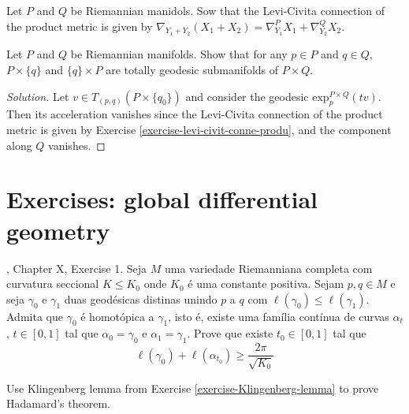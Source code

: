\begin{exercise}
\label{exercise-levi-civit-conne-produ}
Let $P$ and $Q$ be Riemannian manidols. Sow
that the Levi-Civita connection of
the product metric is given by
$\nabla_{Y_1+Y_2}(X_1+X_2)=\nabla^P_{Y_1}X_1+
\nabla^Q_{Y_2}X_2$.
\end{exercise}

\begin{exercise}
\label{exercise-total-geode-subma-produ}
Let $P$ and $Q$ be Riemannian manifolds. Show
that for any $p \in P$ and $q \in
Q$, $P\times \{q\}$ and $\{q\}\times P$ are
totally geodesic
submanifolds of $P \times Q$.
\end{exercise}

\begin{proof}[Solution]
Let $v \in T_{(p,q)}(P\times\{q_0\})$ and
consider the geodesic
 $\text{exp}_p^{P\times Q}(tv)$. Then
its acceleration vanishes since the
Levi-Civita connection of the product metric
is given by Exercise
\ref{exercise-levi-civit-conne-produ}, and
the
component along $Q$ vanishes.
\end{proof}

\section{Exercises: global differential
geometry}
\label{section-exerc-globa-diffe-geome}

\begin{exercise}
\label{exercise-Klingenberg-lemma}
\cite{doc}, Chapter X, Exercise 1. Seja $M$
uma variedade Riemanniana
completa com curvatura seccional $K \leq
K_0$ onde $K_0$ é uma constante
positiva. Sejam $p,q \in M$ e seja $\gamma_0$
e $\gamma_1$ duas geodésicas
distinas unindo $p$ a $q$ com
$\ell(\gamma_0) \leq  \ell(\gamma_1)$.
Admita que $\gamma_0$ é homotópica a
$\gamma_1$, isto é, existe uma família
contínua de curvas $\alpha_t$, $t \in [0,1]$
tal que $\alpha_0 = \gamma_0$
e $\alpha_1=\gamma_1$. Prove que existe $t_0
\in [0,1]$ tal que
$$
\ell(\gamma_0)+\ell(\alpha_{t_0}) \geq
\frac{2\pi}{\sqrt{K_0} }
$$
\end{exercise}

\begin{exercise}
\label{exercise-Hadamard-via-Kingenberg}
Use Klingenberg lemma from Exercise
\ref{exercise-Klingenberg-lemma} to prove
Hadamard's theorem.
\end{exercise}

